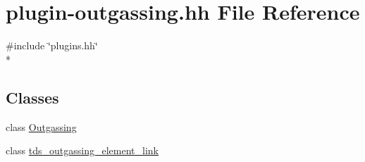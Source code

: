 \hypertarget{plugin-outgassing_8hh}{}\section{plugin-\/outgassing.hh File Reference}
\label{plugin-outgassing_8hh}
{\ttfamily \#include \char`\"{}plugins.\+hh\char`\"{}}\\*
\subsection*{Classes}
\begin{DoxyCompactItemize}
\item 
class \hyperlink{classOutgassing}{Outgassing}
\item 
class \hyperlink{classtds__outgassing__element__link}{tds\+\_\+outgassing\+\_\+element\+\_\+link}
\end{DoxyCompactItemize}
